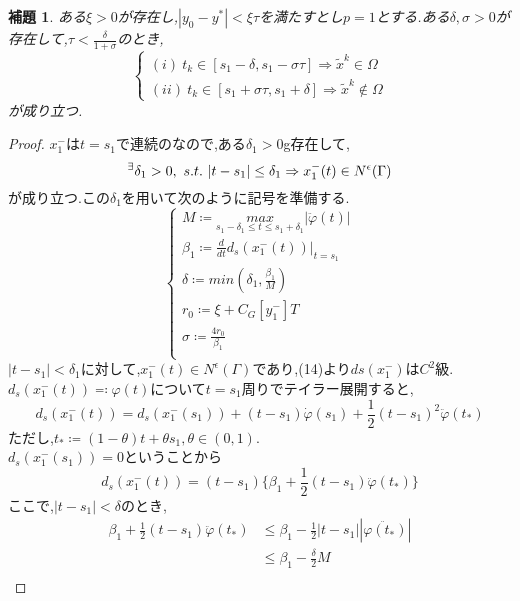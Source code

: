 \documentclass[a4,12pt]{article}
\newtheorem{lem}{補題}
\begin{document}
\begin{lem}
\label{dom}
ある$\xi>0$が存在し,$|y_0-y^\ast|<\xi\tau$を満たすとし$p=1$とする.ある$\delta,\sigma>0$が存在して,$\tau<\frac{\delta}{1+\sigma}$のとき,
\begin{equation}
    \begin{cases}
        (i)\ t_k\in [s_1-\delta,s_1-\sigma\tau ] \Rightarrow \tilde{x}^k\in\Omega\\
        (ii)\ t_k\in [s_1+\sigma\tau, s_1+\delta ] \Rightarrow \tilde{x}^k\notin\Omega
    \end{cases}
\end{equation}
が成り立つ.\\
\end{lem}
\begin{proof}
    $x^-_1$は$t=s_1$で連続のなので,ある$\delta_1>0$g存在して,
    \[
        {}^\exists\delta_1>0,\ s.t.\ |t-s_1|\leq\delta_1\Rightarrow x^{-}_1(t)\in N^\epsilon(\Gamma)\\
    \]
が成り立つ.この$\delta_1$を用いて次のように記号を準備する.
\begin{equation}\begin{cases}
    M\coloneqq \underset{s_1-\delta_1\le t\le s_1+\delta_1}{max}|\ddot{\varphi}(t)|\\
    \beta_1\coloneqq \frac{d}{dt}d_s(x^-_1(t))|_{t=s_1}\\
    \delta\coloneqq min(\delta_1,\frac{\beta_1}{M})\\
    r_0\coloneqq \xi + C_G[y^-_1]T\\
    \sigma\coloneqq\frac{4r_0}{\beta_1}\\
\end{cases}\end{equation}
    $|t-s_1|<\delta_1$に対して,$x^-_1(t)\in N^\epsilon(\Gamma)$であり,(14)より$ds(x^-_1)$は$C^2$級.\\$d_s(x^{-}_1(t))\eqqcolon\varphi(t)$について$t=s_1$周りでテイラー展開すると,
    \[d_s(x^{-}_1(t))=d_s(x^{-}_1(s_1))+(t-s_1)\dot{\varphi}(s_1)+\frac{1}{2}(t-s_1)^2\ddot{\varphi}(t_\ast)\]   
ただし,$t_\ast\coloneqq (1-\theta)t+\theta s_1,\theta\in(0,1)$.\\
    $d_s(x^{-}_1(s_1))=0$ということから
    \[
        d_s(x^{-}_1(t))=(t-s_1)\{\beta_1+\frac{1}{2}(t-s_1)\ddot{\varphi}(t_\ast)\}
    \]
ここで,$|t-s_1|<\delta$のとき,
\begin{align*}
    \beta_1+\frac{1}{2}(t-s_1)\ddot{\varphi}(t_\ast)
    &\le \beta_1-\frac{1}{2}|t-s_1||\ddot{\varphi(t_\ast)}|\\
    &\le \beta_1-\frac{\delta}{2}M\\

\end{align*}
\end{proof}
\end{document}
